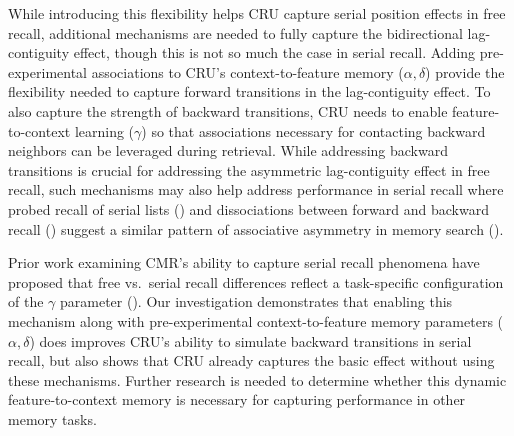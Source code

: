\documentclass[
  man,
  floatsintext,
  longtable,
  nolmodern,
  notxfonts,
  notimes,
  draftfirst,
  colorlinks=true,linkcolor=blue,citecolor=blue,urlcolor=blue]{apa7}
\begin{document}
While introducing this flexibility helps CRU capture serial position
effects in free recall, additional mechanisms are needed to fully
capture the bidirectional lag-contiguity effect, though this is not so
much the case in serial recall. Adding pre-experimental associations to
CRU's context-to-feature memory (\(\alpha, \delta\)) provide the
flexibility needed to capture forward transitions in the lag-contiguity
effect. To also capture the strength of backward transitions, CRU needs
to enable feature-to-context learning (\(\gamma\)) so that associations
necessary for contacting backward neighbors can be leveraged during
retrieval. While addressing backward transitions is crucial for
addressing the asymmetric lag-contiguity effect in free recall, such
mechanisms may also help address performance in serial recall where
probed recall of serial lists
() and
dissociations between forward and backward recall
() suggest a
similar pattern of associative asymmetry in memory search
().

Prior work examining CMR's ability to capture serial recall phenomena
have proposed that free vs.~serial recall differences reflect a
task-specific configuration of the \(\gamma\) parameter
(). Our investigation
demonstrates that enabling this mechanism along with pre-experimental
context-to-feature memory parameters (\(\alpha, \delta\)) does improves
CRU's ability to simulate backward transitions in serial recall, but
also shows that CRU already captures the basic effect without using
these mechanisms. Further research is needed to determine whether this
dynamic feature-to-context memory is necessary for capturing performance
in other memory tasks.
\end{document}

